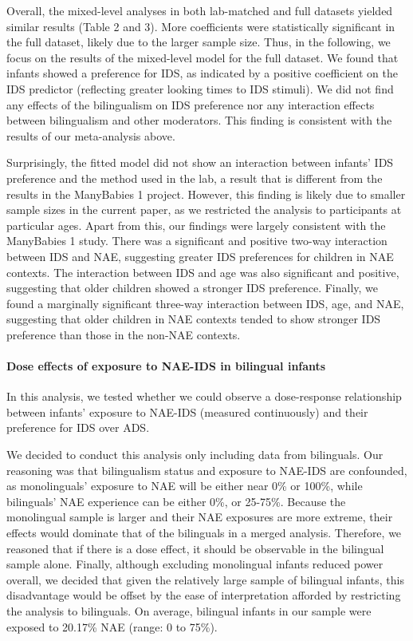 \documentclass[,man,floatsintext]{apa6}
\let\oldparagraph\paragraph
\renewcommand{\paragraph}[1]{\oldparagraph{#1}\mbox{}}
\begin{document}
Overall, the mixed-level analyses in both lab-matched and full datasets yielded similar results (Table 2 and 3). More coefficients were statistically significant in the full dataset, likely due to the larger sample size. Thus, in the following, we focus on the results of the mixed-level model for the full dataset. We found that infants showed a preference for IDS, as indicated by a positive coefficient on the IDS predictor (reflecting greater looking times to IDS stimuli). We did not find any effects of the bilingualism on IDS preference nor any interaction effects between bilingualism and other moderators. This finding is consistent with the results of our meta-analysis above.

Surprisingly, the fitted model did not show an interaction between infants' IDS preference and the method used in the lab, a result that is different from the results in the ManyBabies 1 project. However, this finding is likely due to smaller sample sizes in the current paper, as we restricted the analysis to participants at particular ages. Apart from this, our findings were largely consistent with the ManyBabies 1 study. There was a significant and positive two-way interaction between IDS and NAE, suggesting greater IDS preferences for children in NAE contexts. The interaction between IDS and age was also significant and positive, suggesting that older children showed a stronger IDS preference. Finally, we found a marginally significant three-way interaction between IDS, age, and NAE, suggesting that older children in NAE contexts tended to show stronger IDS preference than those in the non-NAE contexts.

\hypertarget{dose-effects-of-exposure-to-nae-ids-in-bilingual-infants}{%
\paragraph{Dose effects of exposure to NAE-IDS in bilingual infants}\label{dose-effects-of-exposure-to-nae-ids-in-bilingual-infants}}

In this analysis, we tested whether we could observe a dose-response relationship between infants' exposure to NAE-IDS (measured continuously) and their preference for IDS over ADS.

We decided to conduct this analysis only including data from bilinguals. Our reasoning was that bilingualism status and exposure to NAE-IDS are confounded, as monolinguals' exposure to NAE will be either near 0\% or 100\%, while bilinguals' NAE experience can be either 0\%, or 25-75\%. Because the monolingual sample is larger and their NAE exposures are more extreme, their effects would dominate that of the bilinguals in a merged analysis. Therefore, we reasoned that if there is a dose effect, it should be observable in the bilingual sample alone. Finally, although excluding monolingual infants reduced power overall, we decided that given the relatively large sample of bilingual infants, this disadvantage would be offset by the ease of interpretation afforded by restricting the analysis to bilinguals. On average, bilingual infants in our sample were exposed to 20.17\% NAE (range: 0 to 75\%).
\end{document}
